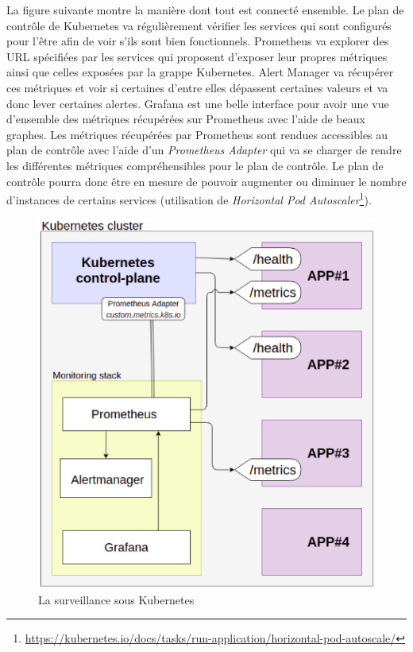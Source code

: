 La figure suivante montre la manière dont tout est connecté ensemble. Le
plan de contrôle de Kubernetes va régulièrement vérifier les services
qui sont configurés pour l'être afin de voir s'ils sont bien
fonctionnels. Prometheus va explorer des URL spécifiées par les services
qui proposent d'exposer leur propres métriques ainsi que celles exposées
par la grappe Kubernetes. Alert Manager va récupérer ces métriques et
voir si certaines d'entre elles dépassent certaines valeurs et va donc
lever certaines alertes. Grafana est une belle interface pour avoir une
vue d'ensemble des métriques récupérées sur Prometheus avec l'aide de
beaux graphes. Les métriques récupérées par Prometheus sont rendues
accessibles au plan de contrôle avec l'aide d'un \textit{Prometheus
Adapter} qui va se charger de rendre les différentes métriques
compréhensibles pour le plan de contrôle. Le plan de contrôle pourra
donc être en mesure de pouvoir augmenter ou diminuer le nombre
d'instances de certains services (utilisation de \textit{Horizontal Pod
Autoscaler}\footnote{
  \url{https://kubernetes.io/docs/tasks/run-application/horizontal-pod-autoscale/}}).

\begin{figure}[h]
  \caption{\label{monitor} La surveillance sous Kubernetes}
  \includegraphics[width=15cm]{images/monitoring}
\end{figure}

